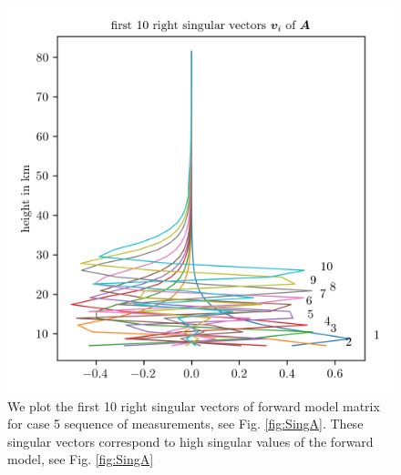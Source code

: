 \begin{figure}[ht!]
	\centering
	\includegraphics{SingVecA.png}
	\caption[First 10 right singular vectors of forward model.]{We plot the first 10 right singular vectors of forward model matrix for case 5 sequence of measurements, see Fig. \ref{fig:SingA}. These singular vectors correspond to high singular values of the forward model, see Fig. \ref{fig:SingA}}
	\label{fig:SingVecA}
\end{figure}
